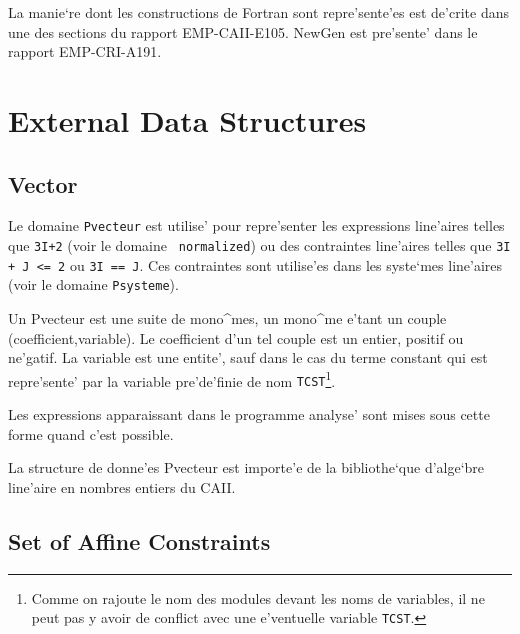 La manie`re dont les constructions de Fortran sont repre'sente'es est
de'crite dans une des sections du rapport EMP-CAII-E105. NewGen est
pre'sente' dans le rapport EMP-CRI-A191.

\section{External Data Structures}
\label{external}

\subsection{Vector}
\label{subsection-pvecteur}

{ Le domaine {\tt Pvecteur} est utilise' pour repre'senter les
expressions line'aires telles que {\tt 3I+2} (voir le domaine {\tt
normalized}) ou des contraintes line'aires telles que {\tt 3I + J <= 2}
ou {\tt 3I == J}. Ces contraintes sont utilise'es dans les syste`mes
line'aires (voir le domaine {\tt Psysteme}).

Un Pvecteur est une suite de mono^mes, un mono^me e'tant un couple
(coefficient,variable).  Le coefficient d'un tel couple est un entier,
positif ou ne'gatif. La variable est une entite', sauf dans le cas du
terme constant qui est repre'sente' par la variable pre'de'finie de nom
{\tt TCST}\footnote{Comme on rajoute le nom des modules devant les
noms de variables, il ne peut pas y avoir de conflict avec une
e'ventuelle variable {\tt TCST}.}.

Les expressions apparaissant dans le programme analyse' sont mises
sous cette forme quand c'est possible.

La structure de donne'es Pvecteur est importe'e de la bibliothe`que d'alge`bre
line'aire en nombres entiers du CAII.
}

\subsection{Set of Affine Constraints}
\label{subsection-psysteme}

